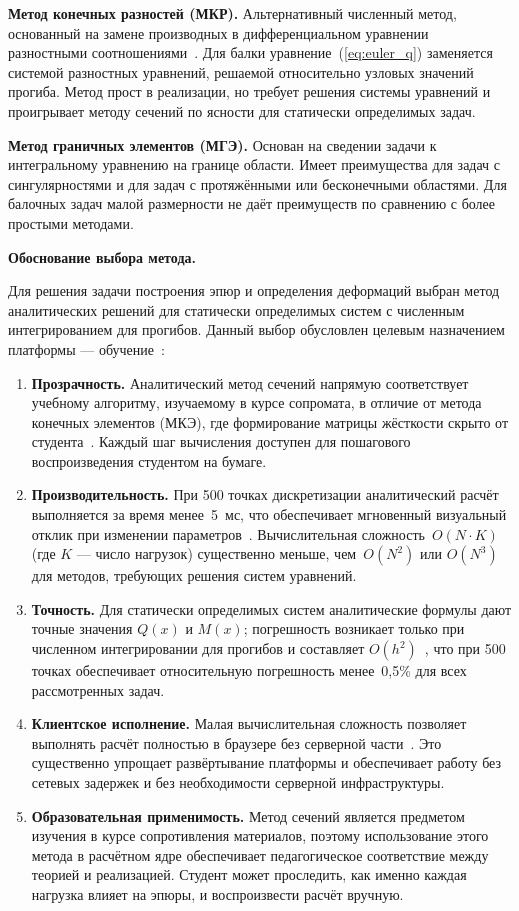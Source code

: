 \textbf{Метод конечных разностей (МКР).} Альтернативный численный метод, основанный на замене производных в дифференциальном уравнении разностными соотношениями~\cite{samarsky, bahvalov}. Для балки уравнение~(\ref{eq:euler_q}) заменяется системой разностных уравнений, решаемой относительно узловых значений прогиба. Метод прост в реализации, но требует решения системы уравнений и проигрывает методу сечений по ясности для статически определимых задач.

\textbf{Метод граничных элементов (МГЭ).} Основан на сведении задачи к интегральному уравнению на границе области. Имеет преимущества для задач с сингулярностями и для задач с протяжёнными или бесконечными областями. Для балочных задач малой размерности не даёт преимуществ по сравнению с более простыми методами.

\textbf{Обоснование выбора метода.}

Для решения задачи построения эпюр и определения деформаций выбран метод аналитических решений для статически определимых систем с численным интегрированием для прогибов. Данный выбор обусловлен целевым назначением платформы --- обучение~\cite{feodosev, philpot2006}:

\begin{enumerate}
  \item \textbf{Прозрачность.} Аналитический метод сечений напрямую соответствует учебному алгоритму, изучаемому в курсе сопромата, в отличие от метода конечных элементов (МКЭ), где формирование матрицы жёсткости скрыто от студента~\cite{zenkevich, zienkiewicz2013}. Каждый шаг вычисления доступен для пошагового воспроизведения студентом на бумаге.
  \item \textbf{Производительность.} При 500 точках дискретизации аналитический расчёт выполняется за время менее~5~мс, что обеспечивает мгновенный визуальный отклик при изменении параметров~\cite{bahvalov}. Вычислительная сложность~$O(N \cdot K)$ (где $K$ --- число нагрузок) существенно меньше, чем~$O(N^2)$ или $O(N^3)$ для методов, требующих решения систем уравнений.
  \item \textbf{Точность.} Для статически определимых систем аналитические формулы дают точные значения $Q(x)$ и $M(x)$; погрешность возникает только при численном интегрировании для прогибов и составляет $O(h^2)$~\cite{samarsky}, что при 500 точках обеспечивает относительную погрешность менее~0{,}5\% для всех рассмотренных задач.
  \item \textbf{Клиентское исполнение.} Малая вычислительная сложность позволяет выполнять расчёт полностью в браузере без серверной части~\cite{flanagan2020, cherny2019}. Это существенно упрощает развёртывание платформы и обеспечивает работу без сетевых задержек и без необходимости серверной инфраструктуры.
  \item \textbf{Образовательная применимость.} Метод сечений является предметом изучения в курсе сопротивления материалов, поэтому использование этого метода в расчётном ядре обеспечивает педагогическое соответствие между теорией и реализацией. Студент может проследить, как именно каждая нагрузка влияет на эпюры, и воспроизвести расчёт вручную.
\end{enumerate}

